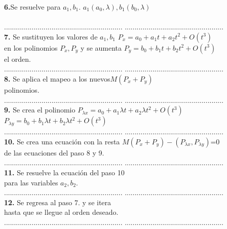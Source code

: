 \begin{center}
\begin{tabbing}
		\>\textbf{6.}Se resuelve para $a_{1},b_{1}$.\> $a_{1}(a_{0}, \lambda), b_{1}(b_{0},\lambda)$\\
		\> \> \\
		\>............................................................  \>..................................................\\
		\> \textbf{7. }Se sustituyen los valores de $a_{1},b_{1}$ \> $P_{x} = a_{0}+a_{1}t+a_{2}t^{2}+O(t^{3})$\\
		\> en los polinomios $P_{x},P_{y}$ y se aumenta\>  $P_{y} = b_{0} +b_{1}t +b_{2}t^{2}+O(t^{3})$\\
		\>  el orden.\> \\
		\>............................................................  \>..................................................\\
		\>\textbf{8.} Se aplica el mapeo a los nuevos\>$M(P_{x}+P_{y})$ \\
		\> polinomios.\>\\
		\>............................................................  \>..................................................\\
		\>\textbf{9.} Se crea el polinomio \> $P_{\lambda x} = a_{0}+a_{1}\lambda t+a_{2}\lambda t^{2}+O(t^{3})$\\
		\> \>$P_{\lambda y} = b_{0}+b_{1}\lambda t+b_{2}\lambda t^{2}+O(t^{3})$\\
		\>............................................................  \>..................................................\\
		\>\textbf{10.} Se crea una ecuación con la resta \> $M(P_{x}+P_{y}) -(P_{\lambda x},P_{\lambda y})$=0 \\
		\> de las ecuaciones del paso 8 y 9.\> \\
		\>............................................................  \>..................................................\\
		\> \textbf{11.} Se resuelve la ecuación del paso 10 \>  \\
		\> para las variables $a_{2},b_{2}$. \>\\
		\>............................................................  \>..................................................\\
		\> \textbf{12.} Se regresa al paso 7. y se itera\> \\
		\> hasta que se llegue al orden deseado. \> \\
		\>............................................................  \>..................................................\\
		
		
		
		
	\end{tabbing} 
\end{center}



